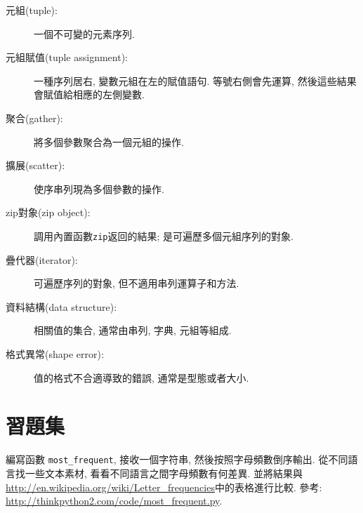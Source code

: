 \documentclass[10pt]{book}
\begin{document}
\begin{description}

\item[元組(tuple):] 一個不可變的元素序列. 

\item[元組賦值(tuple assignment):] 一種序列居右, 變數元組在左的賦值語句. 
等號右側會先運算, 然後這些結果會賦值給相應的左側變數. 

\item[聚合(gather):] 將多個參數聚合為一個元組的操作.

\item[擴展(scatter):] 使序串列現為多個參數的操作. 

\item[zip對象(zip object):] 調用內置函數{\tt zip}返回的結果;
是可遍歷多個元組序列的對象. 

\item[疊代器(iterator):] 可遍歷序列的對象, 但不適用串列運算子和方法. 

\item[資料結構(data structure):] 相關值的集合, 通常由串列, 字典, 元組等組成. 

\item[格式異常(shape error):] 值的格式不合適導致的錯誤, 通常是型態或者大小. 

\end{description}


\section{習題集}

\begin{exercise}

編寫函數 \verb"most_frequent", 接收一個字符串, 然後按照字母頻數倒序輸出. 
從不同語言找一些文本素材, 看看不同語言之間字母頻數有何差異. 
並將結果與\url{http://en.wikipedia.org/wiki/Letter_frequencies}中的表格進行比較. 
參考:
\url{http://thinkpython2.com/code/most_frequent.py}.  

\end{exercise}
\end{document}
